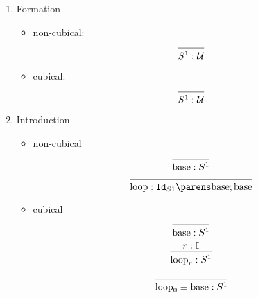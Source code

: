 \documentclass[11pt]{article}
\begin{document}
\begin{enumerate}
    \item Formation
        \begin{itemize}
            \item non-cubical:
\[
  \begin{prooftree}
      \infer0{\oftype{S^1}{\UU}}
  \end{prooftree}
\]
            \item cubical:
\[
  \begin{prooftree}
      \infer0{\oftype{S^1}{\UU}}
  \end{prooftree}
\]
        \end{itemize}

    \item Introduction
        \begin{itemize}
            \item non-cubical
\[
    \begin{prooftree}
        \infer0{\oftype{\base}{S^1}}
    \end{prooftree}
\]
\[
    \begin{prooftree}
        \infer0{\oftype{\loops}{\idtype{S1}{\base}{\base}}}
    \end{prooftree}
\]
            \item cubical
\[
    \begin{prooftree}
        \infer0{\oftype{\base}{S^1}}
    \end{prooftree}
\]
\[
    \begin{prooftree}
        \hypo{\oftype{r}{\bI}}
        \infer1{\oftype{\loops_r}{S^1}}
    \end{prooftree}
\]
 
\[
    \begin{prooftree}
        \infer0{\oftype{\eqtype{\loops_0}{\base}}{S^1}}
    \end{prooftree}
\]


\end{itemize}
\end{enumerate}
\end{document}
